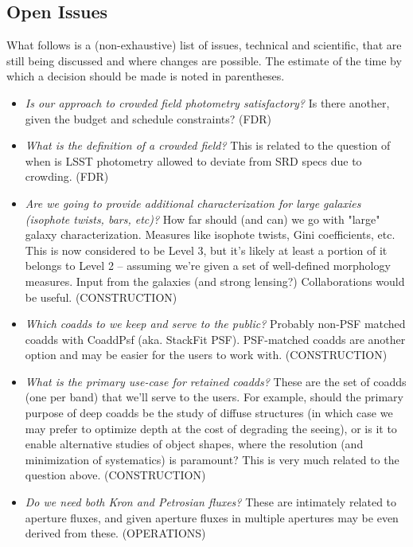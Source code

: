 \documentclass[12pt]{article}
\begin{document}
\begin{openissues}
\subsection{Open Issues}

What follows is a (non-exhaustive) list of issues, technical and scientific, that are still being discussed and where changes are possible. The estimate of the time by which a decision should be made is noted in parentheses.

\begin{itemize}
    \item {\em Is our approach to crowded field photometry satisfactory?} Is there another, given the budget and schedule constraints? (FDR)

    \item {\em What is the definition of a crowded field?} This is related to the question of when is LSST photometry allowed to deviate from SRD specs due to crowding. (FDR)

    \item {\em Are we going to provide additional characterization for large galaxies (isophote twists, bars, etc)?} How far should (and can) we go with "large" galaxy characterization. Measures like isophote twists, Gini coefficients, etc. This is now considered to be Level 3, but it's likely at least a portion of it belongs to Level 2 -- assuming we're given a set of well-defined morphology measures. Input from the galaxies (and strong lensing?) Collaborations would be useful. (CONSTRUCTION)

    \item {\em Which coadds to we keep and serve to the public?} Probably non-PSF matched coadds with CoaddPsf (aka. StackFit PSF). PSF-matched coadds are another option and may be easier for the users to work with. (CONSTRUCTION)

    \item {\em What is the primary use-case for retained coadds?} These are the set of coadds (one per band) that we'll serve to the users. For example, should the primary purpose of deep coadds be the study of diffuse structures (in which case we may prefer to optimize depth at the cost of degrading the seeing), or is it to enable alternative studies of object shapes, where the resolution (and minimization of systematics) is paramount? This is very much related to the question above. (CONSTRUCTION)

    \item {\em Do we need both Kron and Petrosian fluxes?} These are intimately related to aperture fluxes, and given aperture fluxes in multiple apertures may be even derived from these. (OPERATIONS)


\end{itemize}
\end{openissues}
\end{document}
